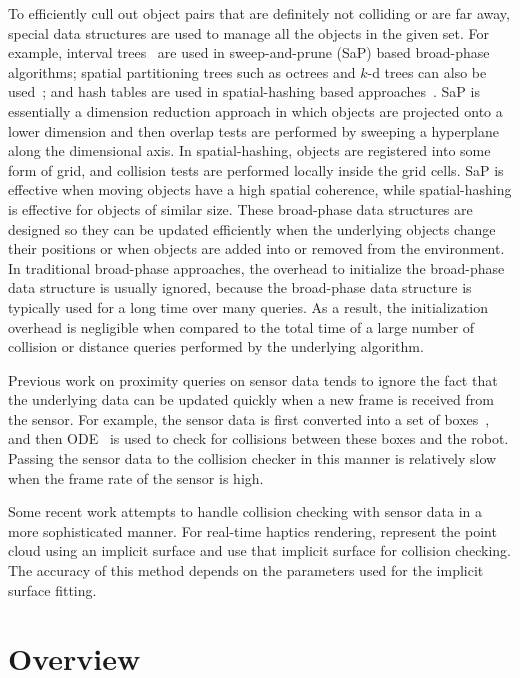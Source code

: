 To efficiently cull out object pairs that are definitely not colliding
or are far away, special data structures are used to manage all
the objects in the given set. For example, interval
trees~\cite{Tracy:2009:ELS} are used in sweep-and-prune (SaP) based broad-phase algorithms; spatial partitioning trees such as octrees and $k$-d
trees can also be used~\cite{Bandi:1995}; and hash tables are used in
spatial-hashing based approaches~\cite{Eric2004book}. SaP is essentially a dimension reduction
approach in which objects are projected onto a lower dimension
and then overlap tests are performed by sweeping a hyperplane along the dimensional axis.
In spatial-hashing, objects are registered into some form of grid, and collision tests are performed
locally inside the grid cells. SaP is effective when moving objects have
a high spatial coherence, while spatial-hashing is effective for objects of similar size.
These broad-phase data structures are designed so they can be updated efficiently when the
underlying objects change their positions or when objects are added
into or removed from the environment. In traditional broad-phase
approaches, the overhead to initialize the broad-phase data structure
is usually ignored, because the broad-phase data structure is
typically used for a long time over many queries. As a result, the
initialization overhead is negligible when compared to the total time
of a large number of collision or distance queries performed by the
underlying algorithm.

Previous work on proximity queries on sensor data tends to ignore the
fact that the underlying data can be updated quickly when a new frame
is received from the sensor. For example, the
sensor data is first converted into a set of boxes~\cite{Rusu:RPG:2009}, and then ODE~\cite{ODE} is used to check for collisions between these
boxes and the robot. Passing the sensor data to the collision checker
in this manner is relatively slow when the frame rate of the sensor is
high.

Some recent work attempts to handle collision checking with sensor
data in a more sophisticated manner. For real-time haptics rendering,
\cite{Leeper:ICRA:2012} represent the point cloud using
an implicit surface and use that implicit surface for collision
checking. The accuracy of this method depends on the parameters used for
the implicit surface fitting.


\section{Overview}
\label{sec:8:overview}

